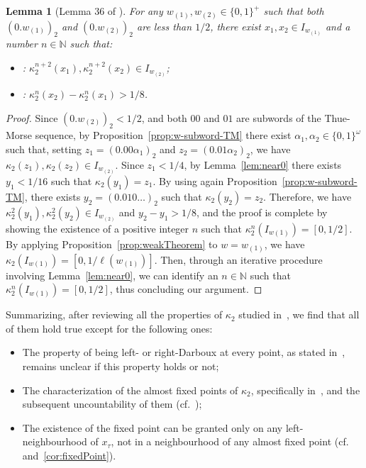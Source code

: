 \documentclass[12pt]{article}
\theoremstyle{plain}\newtheorem{teo}{Theorem}
\theoremstyle{plain}\newtheorem{proposition}[teo]{Proposition}
\theoremstyle{plain}\newtheorem{lemma}[teo]{Lemma}
\theoremstyle{plain}\newtheorem{corollary}[teo]{Corollary}
\theoremstyle{plain}\newtheorem{conjecture}[teo]{Conjecture}
\theoremstyle{definition}\newtheorem{definition}[teo]{Definition}
\theoremstyle{remark}\newtheorem{remark}[teo]{Remark}
\theoremstyle{definition}\newtheorem{example}[teo]{Example}
\numberwithin{teo}{section}
\numberwithin{equation}{section}
\begin{document}
\begin{lemma}[Lemma 36 of \cite{Critical}]
	\label{lem:finite-LiYorke}
	For any $w_{(1)},w_{(2)}\in\{0,1\}^+$
	such that both $(0.w_{(1)})_2$ 
	and $(0.w_{(2)})_2$ are less than $1/2$,
	there exist $x_1,x_2 \in I_{w_{(1)}}$
	and a number $n\in\mathbb{N}$
	such that:
	\begin{itemize}
		\item[(i)]:
			$\kappa_2^{n+2}(x_1),\kappa_2^{n+2}(x_2)\in I_{w_{(2)}}$;
		\item[(ii)]:
			$\kappa_2^{n}(x_2)-\kappa_2^{n}(x_1) > 1/8$.
	\end{itemize}
\end{lemma}
\begin{proof}
	Since $(0.w_{(2)})_2 < 1/2$,
	and both $00$ and $01$ are subwords of the Thue-Morse sequence,
	by Proposition~\ref{prop:w-subword-TM}
	there exist $\alpha_1,\alpha_2 \in \{0,1\}^\omega$
	such that,
	setting $z_1 = (0.00\alpha_1)_2$
	and $z_2 = (0.01\alpha_2)_2$,
	we have 
	$\kappa_2(z_1),\kappa_2(z_2)\in I_{w_{(2)}}$.
	Since $z_1 < 1/4$, by Lemma~\ref{lem:near0}
	there exists $y_1 < 1/16$ such that $\kappa_2(y_1) = z_1$.
	By using again Proposition~\ref{prop:w-subword-TM},
	there exists $y_2 = (0.010\dots)_2$
	such that $\kappa_2(y_2) = z_2$.
	Therefore, we have
	$\kappa_2^2(y_1),\kappa_2^2(y_2) \in I_{w_{(2)}}$
	and $y_2 - y_1 > 1/8$,
	and the proof is complete by showing 
	the existence of a positive integer $n$
	such that $\kappa_2^n(I_{w(1)}) = [0,1/2]$.
	By applying Proposition~\ref{prop:weakTheorem}
	to $w = w_{(1)}$,
	we have
	$\kappa_2(I_{w(1)}) = [0,1/\ell(w_{(1)})]$.
	Then, through an iterative procedure involving 
	Lemma~\ref{lem:near0},
	we can identify an $n \in \mathbb{N}$
	such that $\kappa_2^n(I_{w(1)}) = [0,1/2]$,
	thus concluding our argument.
\end{proof}

Summarizing,
after reviewing all the properties of $\kappa_2$ studied in~\cite{Critical},
we find that all of them hold true
except for the following ones:
\begin{itemize}
	\item The property of being left- or right-Darboux
		at every point, as stated in~\cite[Proposition 19]{Critical},
		remains unclear if this property holds or not;
	\item The characterization of the almost fixed points of $\kappa_2$,
		specifically in~\cite[Corollary 24]{Critical},
		and the subsequent uncountability of them
		(cf.~\cite[Corollary 25]{Critical});
	\item The existence of the fixed point can be granted 
		only on any left-neighbourhood of $x_\tau$,
		not in a neighbourhood of any almost fixed point
		(cf.~\cite[Corollary 26]{Critical}
		and~\ref{cor:fixedPoint}).
\end{itemize}
\end{document}
